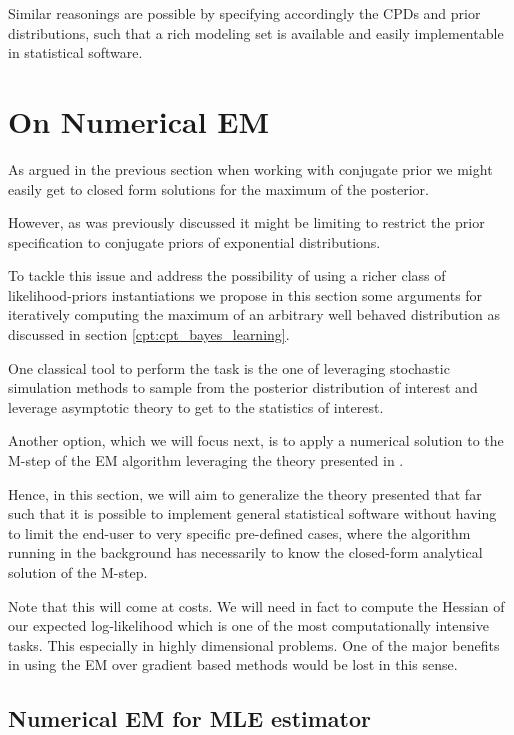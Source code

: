 \documentclass[11pt]{article}
\begin{document}
\begin{article}
Similar reasonings are possible by specifying accordingly the CPDs
and prior distributions, such that a rich modeling set is
available and easily implementable in statistical software.

\newpage

\section{On Numerical EM}
\label{numerical-em}
As argued in the previous section when working with conjugate prior
we might easily get to closed form solutions for the maximum of the
posterior.

However, as was previously discussed it might be limiting to
restrict the prior specification to conjugate priors of exponential
distributions.

To tackle this issue and address the possibility of using a richer
class of likelihood-priors instantiations we propose in this
section some arguments for iteratively computing the maximum of an
arbitrary well behaved distribution as discussed in section
\ref{cpt:cpt_bayes_learning}.

One classical tool to perform the task is the one of leveraging
stochastic simulation methods to sample from the posterior
distribution of interest and leverage asymptotic theory to get to
the statistics of interest.

Another option, which we will focus next, is to apply a numerical
solution to the M-step of the EM algorithm leveraging the theory
presented in \cite{ruud1989comparison}.

Hence, in this section, we will aim to generalize the theory
presented that far such that it is possible to implement general
statistical software without having to limit the end-user to very
specific pre-defined cases, where the algorithm running in the
background has necessarily to know the closed-form analytical
solution of the M-step.

Note that this will come at costs. We will need in fact to compute
the Hessian of our expected log-likelihood which is one of the most
computationally intensive tasks. This especially in highly
dimensional problems. One of the major benefits in using the EM over
gradient based methods would be lost in this sense.

\subsection{Numerical EM for MLE estimator}
\label{sec:org1316529}


\end{article}
\end{document}
